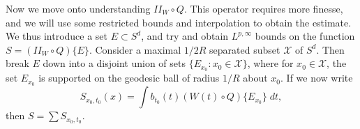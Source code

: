 \begin{comment}

%

\begin{lemma}
    We have
    \[ \| (II_W \circ Q^{\text{Low}}_A) f \|_{L^{p^*}(M)} \lesssim C_p(h) \| f \|_{L^{p^*}(M)}, \]
    where the implicit constant is uniform in $R$.
\end{lemma}
\begin{proof}
    The smoothness of $A$ implies that the function
    \[ Z(t,s,x,y) = \iint W(t,x,z) A(s,z,y)\; dz \]
    is smooth (a distribution applied to a smooth function is smooth). We can then write the kernel of $II_W \circ Q^{\text{Low}}_A$ as
    \[ K(x,y) = \iint b(t) c(s) Z(t,s,x,y)\; dt\; ds. \]
    As in Lemma \ref{IIALemma}, applying H\"{o}lder's inequality to separate out the $b$ variable from the other variables gives that for $1 \leq p < 2d/(d+1)$,
    \[ \| K \|_{L^\infty_x(S^d) L^\infty_y(S^d)} \lesssim C_p(h) R^{1/p^* - s_p} \lesssim C_p(h), \]
    and we can again apply Schur's Lemma.
\end{proof}

\end{comment}

Now we move onto understanding $II_W \circ Q$. This operator requires more finesse, and we will use some restricted bounds and interpolation to obtain the estimate. We thus introduce a set $E \subset S^d$, and try and obtain $L^{p,\infty}$ bounds on the function $S = (II_W \circ Q) \{ E \}$. Consider a maximal $1/2R$ separated subset $\mathcal{X}$ of $S^d$. Then break $E$ down into a disjoint union of sets $\{ E_{x_0}: x_0 \in \mathcal{X} \}$, where for $x_0 \in \mathcal{X}$, the set $E_{x_0}$ is supported on the geodesic ball of radius $1/R$ about $x_0$. If we now write
%
\[ {S\!}_{x_0,t_0}(x) = \int b_{t_0}(t) (W(t) \circ Q) \{ E_{x_0} \}\; dt, \]
% 
then $S = \sum {S\!}_{x_0,t_0}$.

